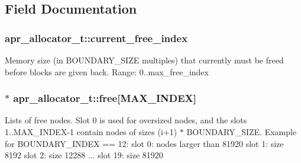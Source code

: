\subsection{Field Documentation}
\subsubsection[{\texorpdfstring{current\+\_\+free\+\_\+index}{current_free_index}}]{ apr\+\_\+allocator\+\_\+t\+::current\+\_\+free\+\_\+index}\hypertarget{structapr__allocator__t_a57c23a44f7748c9c5e7ac12ed7425f85}{}\label{structapr__allocator__t_a57c23a44f7748c9c5e7ac12ed7425f85}
Memory size (in B\+O\+U\+N\+D\+A\+R\+Y\+\_\+\+S\+I\+ZE multiples) that currently must be freed before blocks are given back. Range\+: 0..max\+\_\+free\+\_\+index 
\subsubsection[{\texorpdfstring{free}{free}}]{$\ast$ apr\+\_\+allocator\+\_\+t\+::free\mbox{[}{\bf M\+A\+X\+\_\+\+I\+N\+D\+EX}\mbox{]}}\hypertarget{structapr__allocator__t_a6c86698519a9474b32cc2d3c89aa1222}{}\label{structapr__allocator__t_a6c86698519a9474b32cc2d3c89aa1222}
Lists of free nodes. Slot 0 is used for oversized nodes, and the slots 1..M\+A\+X\+\_\+\+I\+N\+D\+E\+X-\/1 contain nodes of sizes (i+1) $\ast$ B\+O\+U\+N\+D\+A\+R\+Y\+\_\+\+S\+I\+ZE. Example for B\+O\+U\+N\+D\+A\+R\+Y\+\_\+\+I\+N\+D\+EX == 12\+: slot 0\+: nodes larger than 81920 slot 1\+: size 8192 slot 2\+: size 12288 ... slot 19\+: size 81920 
